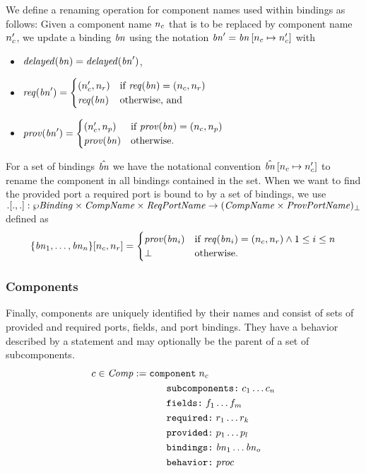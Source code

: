 \documentclass[a4paper,10pt,english]{article}
\begin{document}
We define a renaming operation for component names used within bindings as follows: Given a component name $n_c$ that is
to be replaced by component name $n_c'$, we update a binding $\mathit{bn}$ using the notation $\mathit{bn}' =
\mathit{bn}\left[n_c\mapsto n_c'\right]$ with 
\begin{itemize}
	\item $\mathit{delayed}(\mathit{bn}) = \mathit{delayed}(\mathit{bn}')$,
	\item $\mathit{req}(\mathit{bn}') = 
		\begin{cases}
			(n_c', n_r) & \text{if } \mathit{req}(\mathit{bn}) = (n_c, n_r) \\
			\mathit{req}(\mathit{bn}) & \text{otherwise, and}
		\end{cases}$
	\item $\mathit{prov}(\mathit{bn}') = 
		\begin{cases}
			(n_c', n_p) & \text{if } \mathit{prov}(\mathit{bn}) = (n_c, n_p) \\
			\mathit{prov}(\mathit{bn}) & \text{otherwise.}
		\end{cases}$
\end{itemize}

For a set of bindings $\hat{\mathit{bn}}$ we have the notational convention
$\hat{\mathit{bn}}\left[n_c\mapsto n_c'\right]$ to rename the component in all bindings contained in the set. When we
want to find the provided port a required port is bound to by a set of bindings, we use $.[., .] : \wp \mathit{Binding} \times
\mathit{CompName} \times \mathit{ReqPortName} \rightarrow (\mathit{CompName} \times \mathit{ProvPortName})_\bot$ defined as
\begin{equation*}
	\{\mathit{bn}_1, \ldots, \mathit{bn}_n\}[n_c, n_r] = 
		\begin{cases}
			\mathit{prov}(\mathit{bn}_i) & \text{if } \mathit{req}(\mathit{bn}_i) = (n_c, n_r) \wedge 1 \leq i \leq n \\
			\bot & \text{otherwise.}
		\end{cases}
\end{equation*}

\subsubsection{Components}
Finally, components are uniquely identified by their names and consist of sets
of provided and required ports, fields, and port bindings. They have a behavior described by a statement and may optionally be
the parent of a set of subcomponents.
\begin{align*}
	c \in \mathit{Comp} := & \; 
		\texttt{component} \; n_c\\&\qquad \texttt{subcomponents:} \; c_1 \ldots c_n\\&\qquad \texttt{fields:} \; f_1 \ldots f_m\\&\qquad \texttt{required:} \; r_1 \ldots r_k\\&\qquad \texttt{provided:} \; p_1 \ldots p_l\\&\qquad \texttt{bindings:} \; \mathit{bn}_1 \ldots \mathit{bn}_o\\&\qquad \texttt{behavior:} \; \mathit{proc}
\end{align*}
\end{document}
